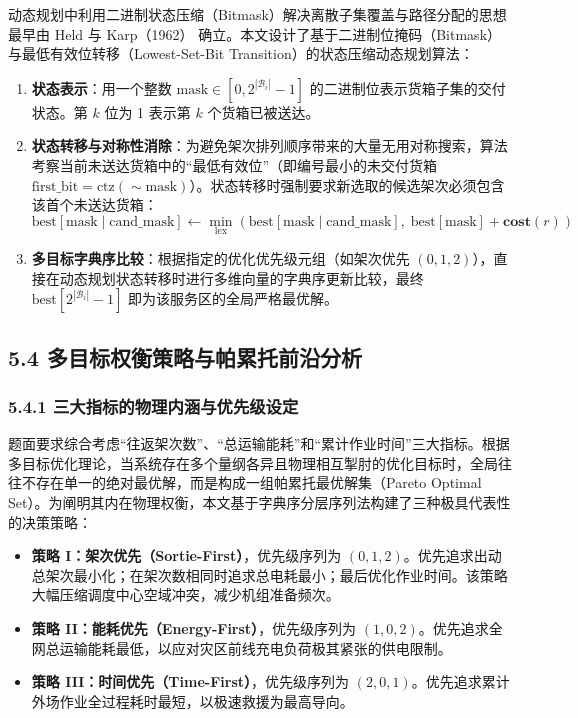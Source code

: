 \documentclass[withoutpreface,bwprint]{format}
\begin{document}
动态规划中利用二进制状态压缩（Bitmask）解决离散子集覆盖与路径分配的思想最早由 Held 与 Karp（1962）\cite{held1962} 确立。本文设计了基于二进制位掩码（Bitmask）与最低有效位转移（Lowest-Set-Bit Transition）的状态压缩动态规划算法：
\begin{enumerate}[leftmargin=*]
    \item \textbf{状态表示}：用一个整数 $\text{mask} \in [0, 2^{|\mathcal{B}_i|}-1]$ 的二进制位表示货箱子集的交付状态。第 $k$ 位为 1 表示第 $k$ 个货箱已被送达。
    \item \textbf{状态转移与对称性消除}：为避免架次排列顺序带来的大量无用对称搜索，算法考察当前未送达货箱中的“最低有效位”（即编号最小的未交付货箱 $\text{first\_bit} = \text{ctz}(\sim \text{mask})$）。状态转移时强制要求新选取的候选架次必须包含该首个未送达货箱：
    \begin{equation}
    \text{best}[\text{mask} \mid \text{cand\_mask}] \gets \min_{\text{lex}} \left( \text{best}[\text{mask} \mid \text{cand\_mask}], \; \text{best}[\text{mask}] + \bm{cost}(r) \right)
    \end{equation}
    \item \textbf{多目标字典序比较}：根据指定的优化优先级元组（如架次优先 $(0, 1, 2)$），直接在动态规划状态转移时进行多维向量的字典序更新比较，最终 $\text{best}[2^{|\mathcal{B}_i|}-1]$ 即为该服务区的全局严格最优解。
\end{enumerate}

\subsection{5.4 多目标权衡策略与帕累托前沿分析}

\subsubsection{5.4.1 三大指标的物理内涵与优先级设定}
题面要求综合考虑“往返架次数”、“总运输能耗”和“累计作业时间”三大指标。根据多目标优化理论\cite{ehrgott2005, marler2004}，当系统存在多个量纲各异且物理相互掣肘的优化目标时，全局往往不存在单一的绝对最优解，而是构成一组帕累托最优解集（Pareto Optimal Set）。为阐明其内在物理权衡，本文基于字典序分层序列法构建了三种极具代表性的决策策略：
\begin{itemize}[leftmargin=*]
    \item \textbf{策略 I：架次优先（Sortie-First）}，优先级序列为 $(0, 1, 2)$。优先追求出动总架次最小化；在架次数相同时追求总电耗最小；最后优化作业时间。该策略大幅压缩调度中心空域冲突，减少机组准备频次。
    \item \textbf{策略 II：能耗优先（Energy-First）}，优先级序列为 $(1, 0, 2)$。优先追求全网总运输能耗最低，以应对灾区前线充电负荷极其紧张的供电限制。
    \item \textbf{策略 III：时间优先（Time-First）}，优先级序列为 $(2, 0, 1)$。优先追求累计外场作业全过程耗时最短，以极速救援为最高导向。
\end{itemize}
\end{document}

